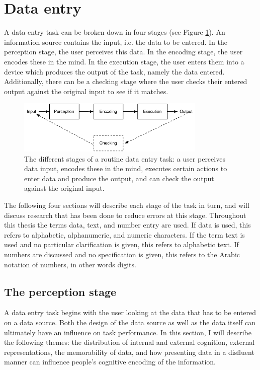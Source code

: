 \documentclass[11pt,oneside]{report}
\begin{document}
\section{Data entry}
A data entry task can be broken down in four stages (see Figure \ref{fig:ch2_hip}). An information source contains the input, i.e. the data to be entered. In the perception stage, the user perceives this data. In the encoding stage, the user encodes these in the mind. In the execution stage, the user enters them into a device which produces the output of the task, namely the data entered. Additionally, there can be a checking stage where the user checks their entered output against the original input to see if it matches.

\begin{figure}[!ht]
\centering
\includegraphics[width=0.8\textwidth]{images/HIP.pdf}
\caption[Different stages of a data entry task]{The different stages of a routine data entry task: a user perceives data input, encodes these in the mind, executes certain actions to enter data and produce the output, and can check the output against the original input.}
\vspace{-3pt}
\label{fig:ch2_hip}
\end{figure}

The following four sections will describe each stage of the task in turn, and will discuss research that has been done to reduce errors at this stage. 
Throughout this thesis the terms data, text, and number entry are used. If data is used, this refers to alphabetic, alphanumeric, and numeric characters. 
If the term text is used and no particular clarification is given, this refers to alphabetic text. If numbers are discussed and no specification is given, this refers to the Arabic notation of numbers, in other words digits. 

\subsection{The perception stage}
A data entry task begins with the user looking at the data that has to be entered on a data source.
Both the design of the data source as well as the data itself can ultimately have an influence on task performance. In this section, I will describe the following themes: the distribution of internal and external cognition, external representations, the memorability of data, and how presenting data in a disfluent manner can influence people's cognitive encoding of the information.
\end{document}
